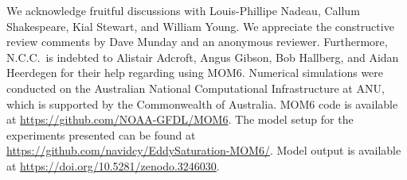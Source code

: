 \documentclass{agujournal2019}
\begin{document}

\vspace*{-0.5em}
\acknowledgments
We acknowledge fruitful discussions with Louis-Phillipe Nadeau, Callum Shakespeare, Kial Stewart, and William Young. {\color{black}We appreciate the constructive review comments by Dave Munday and an anonymous reviewer.} Furthermore, N.C.C.~is indebted to Alistair Adcroft, Angus Gibson, Bob Hallberg, and Aidan Heerdegen for their help regarding using MOM6. Numerical simulations were conducted on the Australian National Computational Infrastructure at ANU, which is supported by the Commonwealth of Australia. MOM6 code is available at \url{https://github.com/NOAA-GFDL/MOM6}. The model setup for the experiments presented can be found at \url{https://github.com/navidcy/EddySaturation-MOM6/}. Model output is available at \url{https://doi.org/10.5281/zenodo.3246030}.
\end{document}
